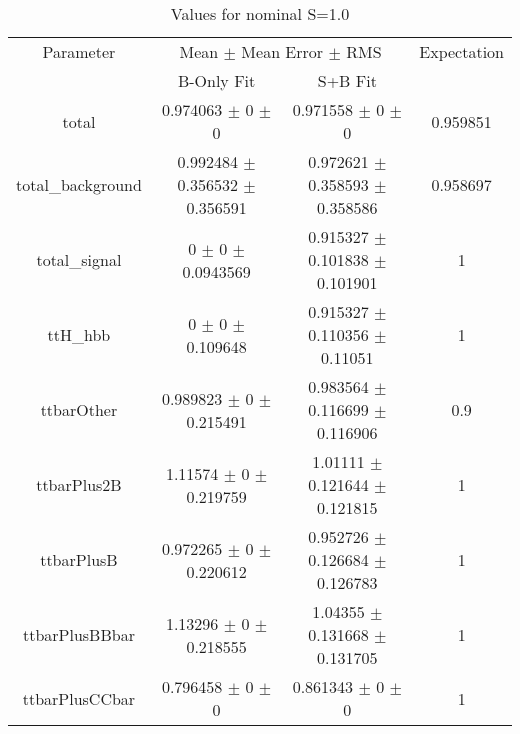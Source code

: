 \begin{table}
\centering
\caption{Values for nominal S=1.0}
\begin{tabular}{cccc}
\toprule
Parameter & \multicolumn{2}{c}{Mean $\pm$ Mean Error $\pm$ RMS} & Expectation\\
 & B-Only Fit & S+B Fit & \\
\midrule
total & \num{0.974063} $\pm$ \num{0} $\pm$ \num{0} & \num{0.971558} $\pm$ \num{0} $\pm$ \num{0} & \num{0.959851}\\
total\_background & \num{0.992484} $\pm$ \num{0.356532} $\pm$ \num{0.356591} & \num{0.972621} $\pm$ \num{0.358593} $\pm$ \num{0.358586} & \num{0.958697}\\
total\_signal & \num{0} $\pm$ \num{0} $\pm$ \num{0.0943569} & \num{0.915327} $\pm$ \num{0.101838} $\pm$ \num{0.101901} & \num{1}\\
ttH\_hbb & \num{0} $\pm$ \num{0} $\pm$ \num{0.109648} & \num{0.915327} $\pm$ \num{0.110356} $\pm$ \num{0.11051} & \num{1}\\
ttbarOther & \num{0.989823} $\pm$ \num{0} $\pm$ \num{0.215491} & \num{0.983564} $\pm$ \num{0.116699} $\pm$ \num{0.116906} & \num{0.9}\\
ttbarPlus2B & \num{1.11574} $\pm$ \num{0} $\pm$ \num{0.219759} & \num{1.01111} $\pm$ \num{0.121644} $\pm$ \num{0.121815} & \num{1}\\
ttbarPlusB & \num{0.972265} $\pm$ \num{0} $\pm$ \num{0.220612} & \num{0.952726} $\pm$ \num{0.126684} $\pm$ \num{0.126783} & \num{1}\\
ttbarPlusBBbar & \num{1.13296} $\pm$ \num{0} $\pm$ \num{0.218555} & \num{1.04355} $\pm$ \num{0.131668} $\pm$ \num{0.131705} & \num{1}\\
ttbarPlusCCbar & \num{0.796458} $\pm$ \num{0} $\pm$ \num{0} & \num{0.861343} $\pm$ \num{0} $\pm$ \num{0} & \num{1}\\
\bottomrule
\end{tabular}
\end{table}